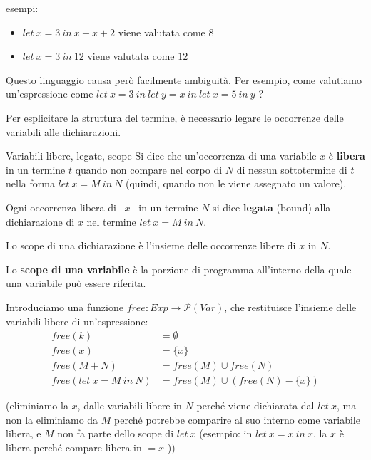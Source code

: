 \documentclass[a4paper,11pt]{report}
\begin{document}
esempi:
\begin{itemize}
    \item \( let \ x = 3 \ in \ x+x+2 \) viene valutata come \( 8 \)
    \item \( let \ x = 3 \ in \ 12 \) viene valutata come \( 12 \)
\end{itemize}

\vspace{0.5em}

Questo linguaggio causa però facilmente ambiguità. Per esempio, come valutiamo un'espressione come \( let \ x = 3 \ in \ let \ y = x \ in \ let \ x = 5 \ in \ y\) ? 

Per esplicitare la struttura del termine, è necessario legare le occorrenze delle variabili alle dichiarazioni.

\begin{defframe}{Variabili libere, legate, scope}{}
    Si dice che un'occorrenza di una variabile \( x \) è \textbf{libera} in un termine \( t \) quando non compare nel corpo di \( N \) di nessun sottotermine di \( t \) nella forma \( let \ x = M \ in \ N \) (quindi, quando non le viene assegnato un valore).

    Ogni occorrenza libera di \ \( x \) \ in un termine \( N \) si dice \textbf{legata} (bound) alla dichiarazione di \( x \) nel termine \( let \ x = M \ in \ N \).

    Lo scope di una dichiarazione è l'insieme delle occorrenze libere di \( x \) in \( N \). 

    Lo \textbf{scope di una variabile} è la porzione di programma all'interno della quale una variabile può essere riferita.

\end{defframe}

Introduciamo una funzione \( free: Exp \to \mathcal{P}(Var) \), che restituisce l'insieme delle variabili libere di un'espressione:
\begin{align*}
    free(k) &= \emptyset \\
    free(x) &= \{x\} \\
    free(M+N) &= free(M) \cup free(N) \\
    free(let \ x = M \ in \ N) &= free(M) \cup (free(N) - \{x\}) 
\end{align*}

{\color{gray}(eliminiamo la \( x \), dalle variabili libere in \( N \) perché viene dichiarata dal \( let \ x \), ma non la eliminiamo da \( M \) perché  potrebbe comparire al suo interno come variabile libera, e \( M \) non fa parte dello scope di \( let \ x \) (esempio: in \( let \ x = x \ in \ x \), la \( x \) è libera perché compare libera in \( = x \) ))}
\end{document}
